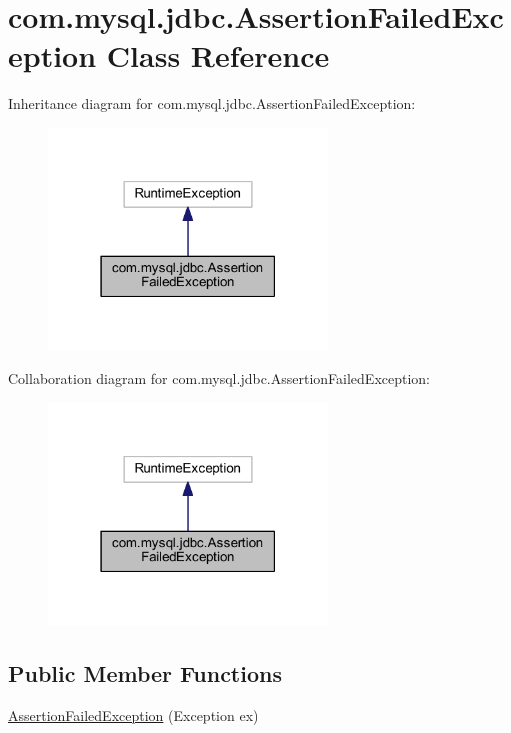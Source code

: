 \hypertarget{classcom_1_1mysql_1_1jdbc_1_1_assertion_failed_exception}{}\section{com.\+mysql.\+jdbc.\+Assertion\+Failed\+Exception Class Reference}
\label{classcom_1_1mysql_1_1jdbc_1_1_assertion_failed_exception}


Inheritance diagram for com.\+mysql.\+jdbc.\+Assertion\+Failed\+Exception\+:\nopagebreak
\begin{figure}[H]
\begin{center}
\leavevmode
\includegraphics[width=210pt]{classcom_1_1mysql_1_1jdbc_1_1_assertion_failed_exception__inherit__graph}
\end{center}
\end{figure}


Collaboration diagram for com.\+mysql.\+jdbc.\+Assertion\+Failed\+Exception\+:\nopagebreak
\begin{figure}[H]
\begin{center}
\leavevmode
\includegraphics[width=210pt]{classcom_1_1mysql_1_1jdbc_1_1_assertion_failed_exception__coll__graph}
\end{center}
\end{figure}
\subsection*{Public Member Functions}
\begin{DoxyCompactItemize}
\item 
\mbox{\hyperlink{classcom_1_1mysql_1_1jdbc_1_1_assertion_failed_exception_a4e3aad4529bc6d57c1c58d52defe4cb8}{Assertion\+Failed\+Exception}} (Exception ex)
\end{DoxyCompactItemize}
